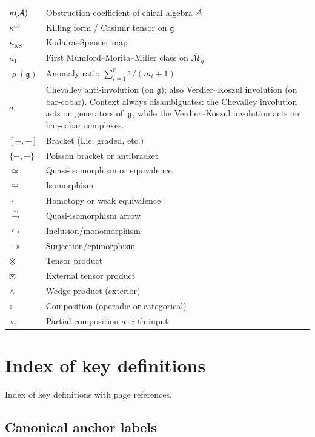 \begin{longtable}{p{3cm} p{10cm}}
$\kappa(\mathcal{A})$ & Obstruction coefficient of chiral algebra $\mathcal{A}$ \\
$\kappa^{ab}$ & Killing form / Casimir tensor on $\mathfrak{g}$ \\
$\kappa_{\mathrm{KS}}$ & Kodaira--Spencer map \\
$\kappa_1$ & First Mumford--Morita--Miller class on $\overline{\mathcal{M}}_g$ \\
$\varrho(\mathfrak{g})$ & Anomaly ratio $\sum_{i=1}^r 1/(m_i+1)$ \\
$\sigma$ & Chevalley anti-involution (on $\mathfrak{g}$); also Verdier--Koszul involution (on bar-cobar).  Context always disambiguates: the Chevalley involution acts on generators of~$\mathfrak{g}$, while the Verdier--Koszul involution acts on bar-cobar complexes. \\
$[-, -]$ & Bracket (Lie, graded, etc.) \\
$\{-, -\}$ & Poisson bracket or antibracket \\
$\simeq$ & Quasi-isomorphism or equivalence \\
$\cong$ & Isomorphism \\
$\sim$ & Homotopy or weak equivalence \\
$\xrightarrow{\sim}$ & Quasi-isomorphism arrow \\
$\hookrightarrow$ & Inclusion/monomorphism \\
$\twoheadrightarrow$ & Surjection/epimorphism \\
$\otimes$ & Tensor product \\
$\boxtimes$ & External tensor product \\
$\wedge$ & Wedge product (exterior) \\
$\circ$ & Composition (operadic or categorical) \\
$\circ_i$ & Partial composition at $i$-th input \\
\end{longtable}


\section{Index of key definitions}
\label{sec:index-definitions}

Index of key definitions with page references.

\subsection*{Canonical anchor labels}

